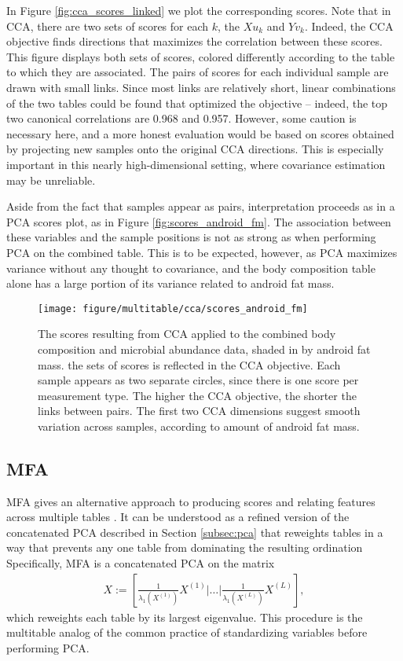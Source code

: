 \documentclass[utf8]{frontiersFPHY} %
\begin{document}
In Figure \ref{fig:cca_scores_linked} we plot the corresponding scores. Note
that in CCA, there are two sets of scores for each $k$, the $Xu_{k}$ and
$Yv_{k}$. Indeed, the CCA objective finds directions that maximizes the
correlation between these scores. This figure displays both sets of scores,
colored differently according to the table to which they are associated. The
pairs of scores for each individual sample are drawn with small links. Since
most links are relatively short, linear combinations of the two tables could be
found that optimized the objective -- indeed, the top two canonical correlations
are 0.968 and 0.957. However, some caution is necessary here, and a more honest
evaluation would be based on scores obtained by projecting new samples onto the
original CCA directions. This is especially important in this nearly
high-dimensional setting, where covariance estimation may be unreliable.

Aside from the fact that samples appear as pairs, interpretation proceeds as in
a PCA scores plot, as in Figure \ref{fig:scores_android_fm}.
The association between these variables and the sample positions is not as
strong as when performing PCA on the combined table. This is to be expected,
however, as PCA maximizes variance without any thought to covariance, and the
body composition table alone has a large portion of its variance related to
android fat mass.

\begin{figure}
  \centering
  \texttt{[image: figure/multitable/cca/scores\_android\_fm]}
  \caption{The scores resulting from CCA applied to the combined body
    composition and microbial abundance data, shaded in by android fat mass.
    the sets of scores is reflected in the CCA objective. Each sample appears as
    two separate circles, since there is one score per measurement type.
    The higher the CCA objective, the shorter the links between pairs.
    The first two CCA dimensions suggest smooth variation across samples,
    according to amount of android fat mass. \label{fig:cca_scores_android_fm} }
\end{figure}

\subsection{MFA}
\label{subsec:mfa}

MFA gives an alternative approach to producing scores and relating features
across multiple tables \citep{pages2014multiple}. It can be understood as a
refined version of the concatenated PCA described in Section \ref{subsec:pca}
that reweights tables in a way that prevents any one table from dominating the
resulting ordination Specifically, MFA is a concatenated PCA on the matrix
\begin{align*}
X := \left[\frac{1}{\lambda_{1}\left(X^{(1)}\right)}X^{(1)} \vert \dots \vert
  \frac{1}{\lambda_{1}\left(X^{(L)}\right)}X^{(L)}\right],
\end{align*}
which reweights each table by its largest eigenvalue. This procedure is the
multitable analog of the common practice of standardizing variables before
performing PCA.
\end{document}

